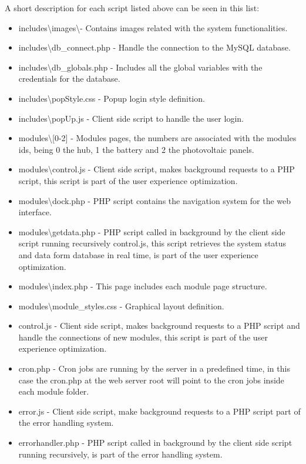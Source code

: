 A short description for each script listed above can be seen in this list:
\begin{itemize}
	\item includes\textbackslash images\textbackslash - Contains images related with the system functionalities.
	\item includes\textbackslash db\_connect.php - Handle the connection to the MySQL database.
	\item includes\textbackslash db\_globals.php - Includes all the global variables with the credentials for the database.
	\item includes\textbackslash popStyle.css - Popup login style definition.
	\item includes\textbackslash popUp.js - Client side script to handle the user login.
	\item modules\textbackslash [0-2] - Modules pages, the numbers are associated with the modules ids, being 0 the hub, 1 the battery and 2 the photovoltaic panels.
	\item modules\textbackslash control.js - Client side script, makes background requests to a PHP script, this script is part of the user experience optimization.
	\item modules\textbackslash dock.php - PHP script contains the navigation system for the web interface.
	\item modules\textbackslash getdata.php - PHP script called in background by the client side script running recursively control.js, this script retrieves the system status and data form database in real time, is part of the user experience optimization.
	\item modules\textbackslash index.php - This page includes each module page structure.
	\item modules\textbackslash module\_styles.css - Graphical layout definition.
	\item control.js - Client side script, makes background requests to a PHP script and handle the connections of new modules, this script is part of the user experience optimization.
	\item cron.php  - Cron jobs are running by the server in a predefined time, in this case the cron.php at the web server root will point to the cron jobs inside each module folder.
	\item error.js - Client side script, make background requests to a PHP script part of the error handling system.
	\item errorhandler.php - PHP script called in background by the client side script running recursively, is part of the error handling system.

\end{itemize}
